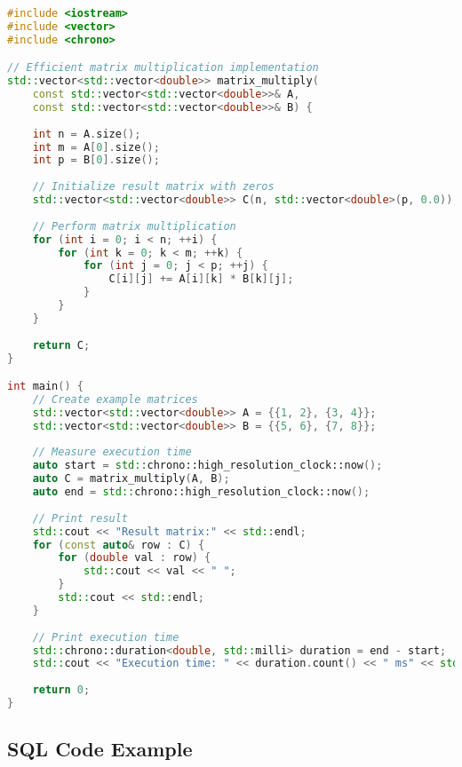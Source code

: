 \documentclass[a4paper,11pt]{article}
\begin{document}
\begin{lstlisting}[language=C++, caption=Efficient Matrix Multiplication, label=lst:cpp]
#include <iostream>
#include <vector>
#include <chrono>

// Efficient matrix multiplication implementation
std::vector<std::vector<double>> matrix_multiply(
    const std::vector<std::vector<double>>& A,
    const std::vector<std::vector<double>>& B) {
    
    int n = A.size();
    int m = A[0].size();
    int p = B[0].size();
    
    // Initialize result matrix with zeros
    std::vector<std::vector<double>> C(n, std::vector<double>(p, 0.0));
    
    // Perform matrix multiplication
    for (int i = 0; i < n; ++i) {
        for (int k = 0; k < m; ++k) {
            for (int j = 0; j < p; ++j) {
                C[i][j] += A[i][k] * B[k][j];
            }
        }
    }
    
    return C;
}

int main() {
    // Create example matrices
    std::vector<std::vector<double>> A = {{1, 2}, {3, 4}};
    std::vector<std::vector<double>> B = {{5, 6}, {7, 8}};
    
    // Measure execution time
    auto start = std::chrono::high_resolution_clock::now();
    auto C = matrix_multiply(A, B);
    auto end = std::chrono::high_resolution_clock::now();
    
    // Print result
    std::cout << "Result matrix:" << std::endl;
    for (const auto& row : C) {
        for (double val : row) {
            std::cout << val << " ";
        }
        std::cout << std::endl;
    }
    
    // Print execution time
    std::chrono::duration<double, std::milli> duration = end - start;
    std::cout << "Execution time: " << duration.count() << " ms" << std::endl;
    
    return 0;
}
\end{lstlisting}

\subsection{SQL Code Example}
\end{document}

